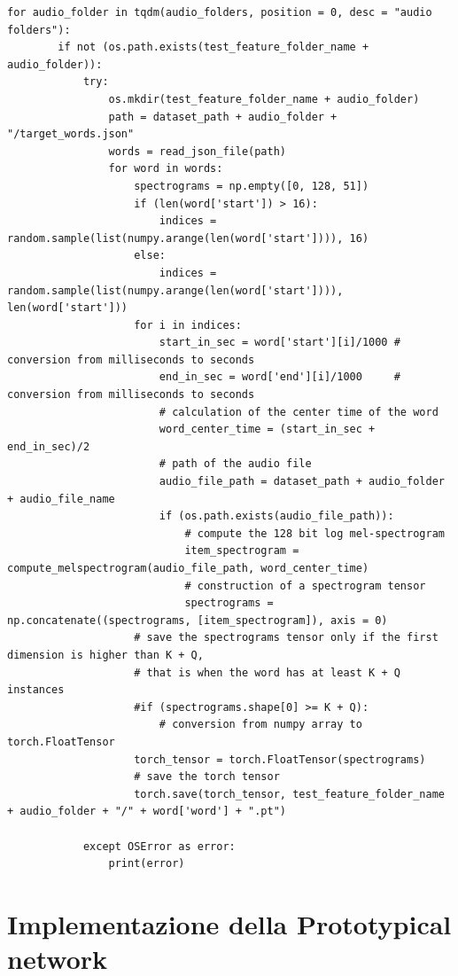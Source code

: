 \documentclass[12pt,a4paper,titlepage]{article}
\begin{document}
\begin{lstlisting}[language=iPython,firstnumber=208, caption=Funzione \texttt{save\_test\_dataset}, label=save_test_dataset,captionpos=b]
    for audio_folder in tqdm(audio_folders, position = 0, desc = "audio folders"):
        if not (os.path.exists(test_feature_folder_name + audio_folder)):
            try:
                os.mkdir(test_feature_folder_name + audio_folder)
                path = dataset_path + audio_folder + "/target_words.json"
                words = read_json_file(path)
                for word in words:
                    spectrograms = np.empty([0, 128, 51])
                    if (len(word['start']) > 16):
                        indices = random.sample(list(numpy.arange(len(word['start']))), 16)
                    else:
                        indices = random.sample(list(numpy.arange(len(word['start']))), len(word['start']))
                    for i in indices:
                        start_in_sec = word['start'][i]/1000 # conversion from milliseconds to seconds
                        end_in_sec = word['end'][i]/1000     # conversion from milliseconds to seconds
                        # calculation of the center time of the word
                        word_center_time = (start_in_sec + end_in_sec)/2
                        # path of the audio file
                        audio_file_path = dataset_path + audio_folder + audio_file_name
                        if (os.path.exists(audio_file_path)):
                            # compute the 128 bit log mel-spectrogram
                            item_spectrogram = compute_melspectrogram(audio_file_path, word_center_time)
                            # construction of a spectrogram tensor
                            spectrograms = np.concatenate((spectrograms, [item_spectrogram]), axis = 0)
                    # save the spectrograms tensor only if the first dimension is higher than K + Q, 
                    # that is when the word has at least K + Q instances
                    #if (spectrograms.shape[0] >= K + Q):
                        # conversion from numpy array to torch.FloatTensor
                    torch_tensor = torch.FloatTensor(spectrograms)
                    # save the torch tensor
                    torch.save(torch_tensor, test_feature_folder_name + audio_folder + "/" + word['word'] + ".pt")
                
            except OSError as error:
                print(error)   
\end{lstlisting}
\clearpage



\section{Implementazione della Prototypical network}
\label{sec:implementazione_protonet}
\end{document}
